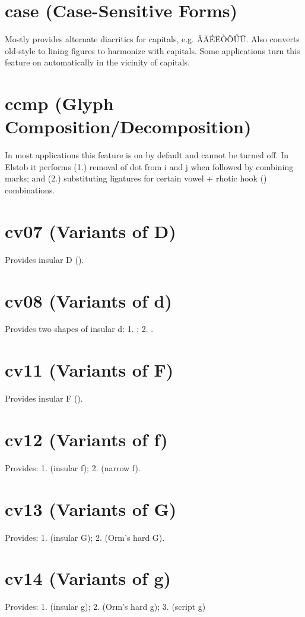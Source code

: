 \documentclass[12pt,letterpaper,openany]{book}
\begin{document}
\section{case (Case-Sensitive Forms)}
Mostly provides alternate diacritics for capitals, e.g. ÂÄÉËÒÕŰŪ. Also converts
old-style to lining figures to harmonize with capitals. Some applications turn
this feature on automatically in the vicinity of capitals.

\section{ccmp (Glyph Composition/Decomposition)}
In most applications this feature is on by default and cannot be turned off.
In Elstob it performs (1.) removal of dot from i and j when followed by combining
marks; and (2.) substituting ligatures for certain vowel + rhotic hook ()
combinations.

\section{cv07 (Variants of D)}
Provides insular D ().

\section{cv08 (Variants of d)}
Provides two shapes of insular d: 1. ; 2. .

\section{cv11 (Variants of F)}
Provides insular F ().

\section{cv12 (Variants of f)}
Provides: 1.  (insular f); 2.  (narrow f).

\section{cv13 (Variants of G)}
Provides: 1.  (insular G); 2.  (Orm’s hard G).

\section{cv14 (Variants of g)}
Provides: 1.  (insular g); 2.  (Orm’s hard g);
3.  (script g)
\end{document}
